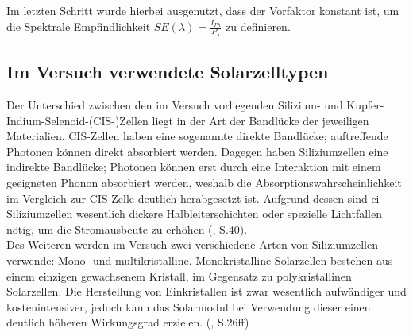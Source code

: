 Im letzten Schritt wurde hierbei ausgenutzt, dass der Vorfaktor konstant ist, um die Spektrale Empfindlichkeit $SE(\lambda) = \frac{I_{Ph}}{P_\lambda}$ zu definieren.

\subsection{Im Versuch verwendete Solarzelltypen}
Der Unterschied zwischen den im Versuch vorliegenden Silizium- und Kupfer-Indium-Selenoid-(CIS-)Zellen liegt in der Art der Bandlücke der 
jeweiligen Materialien. CIS-Zellen haben eine sogenannte direkte Bandlücke; auftreffende Photonen können direkt absorbiert werden. 
Dagegen haben Siliziumzellen eine indirekte Bandlücke; Photonen können erst durch eine Interaktion mit einem geeigneten Phonon 
absorbiert werden, weshalb die Absorptionswahrscheinlichkeit im Vergleich zur CIS-Zelle deutlich herabgesetzt ist. Aufgrund dessen sind 
ei Siliziumzellen wesentlich dickere Halbleiterschichten oder spezielle Lichtfallen nötig, um die Stromausbeute zu erhöhen 
(\cite{Shah2020}, S.40). \\
Des Weiteren werden im Versuch zwei verschiedene Arten von Siliziumzellen verwende: Mono- und multikristalline. Monokristalline 
Solarzellen bestehen aus einem einzigen gewachsenem Kristall, im Gegensatz zu polykristallinen Solarzellen. Die Herstellung von 
Einkristallen ist zwar wesentlich aufwändiger und kostenintensiver, jedoch kann das Solarmodul bei Verwendung dieser einen deutlich 
höheren Wirkungsgrad erzielen. (\cite{Altekrueger2008}, S.26ff)
